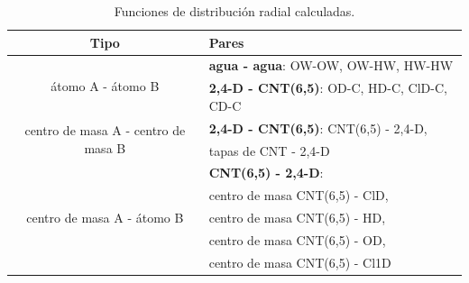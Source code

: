 \begin{table}[h!]
    \centering
    \begin{tabular}{ |c|l|  }
    \hline
    Tipo & Pares \\
    \hline
    \multirow{2}{*}{átomo A - átomo B} 
    & \textbf{agua - agua}: OW-OW, OW-HW, HW-HW \\ 
    & \textbf{2,4-D - CNT(6,5)}: OD-C, HD-C, ClD-C, CD-C \\ 
    \hline
    \multirow{2}{*}{centro de masa A - centro de masa B} 
     & \textbf{2,4-D - CNT(6,5)}: CNT(6,5) - 2,4-D,\\
     & tapas de CNT - 2,4-D \\
    \hline
    \multirow{5}{*}{centro de masa A - átomo B} 
    & \textbf{CNT(6,5) - 2,4-D}: \\
    & centro de masa CNT(6,5) - ClD, \\ 
    & centro de masa CNT(6,5) - HD, \\
    & centro de masa CNT(6,5) - OD, \\
     & centro de masa CNT(6,5) - Cl1D \\
    \hline
    \end{tabular}
    \caption{Funciones de distribución radial calculadas.}
    \label{tab:funcrad}
\end{table}
